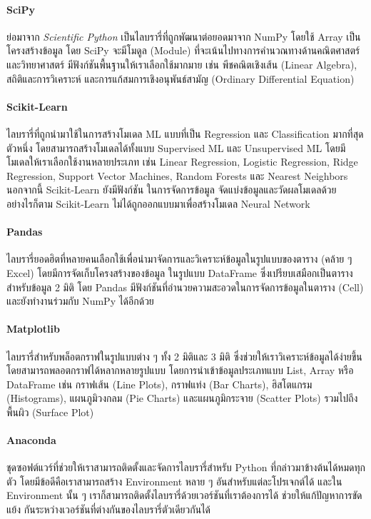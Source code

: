 \paragraph{SciPy} 
ย่อมาจาก \textit{Scientific Python} เป็นไลบรารี่ที่ถูกพัฒนาต่อยอดมาจาก NumPy โดยใช้ Array เป็นโครงสร้างข้อมูล
โดย SciPy จะมีโมดูล (Module) ที่จะเน้นไปทางการคำนวณทางด้านคณิตศาสตร์และวิทยาศาสตร์ มีฟังก์ชันพื้นฐานให้เราเลือกใช้มากมาย เช่น 
พีชคณิตเชิงเส้น (Linear Algebra), สถิติและการวิเคราะห์ และการแก้สมการเชิงอนุพันธ์สามัญ (Ordinary Differential Equation)

\paragraph{Scikit-Learn}
ไลบรารี่ที่ถูกนำมาใช้ในการสร้างโมเดล ML แบบที่เป็น Regression และ Classification มากที่สุดตัวหนึ่ง โดยสามารถสร้างโมเดลได้ทั้งแบบ 
Supervised ML และ Unsupervised ML โดยมีโมเดลให้เราเลือกใช้งานหลายประเภท เช่น Linear Regression, Logistic Regression, 
Ridge Regression, Support Vector Machines, Random Forests และ Nearest Neighbors นอกจากนี้ Scikit-Learn ยังมีฟังก์ชัน%
ในการจัดการข้อมูล จัดแบ่งข้อมูลและวัดผลโมเดลด้วย อย่างไรก็ตาม Scikit-Learn ไม่ได้ถูกออกแบบมาเพื่อสร้างโมเดล Neural Network

\paragraph{Pandas}
ไลบรารี่ยอดฮิตที่หลายคนเลือกใช้เพื่อนำมาจัดการและวิเคราะห์ข้อมูลในรูปแบบของตาราง (คล้าย ๆ Excel) โดยมีการจัดเก็บโครงสร้างของข้อมูล%
ในรูปแบบ DataFrame ซึ่งเปรียบเสมือกเป็นตารางสำหรับข้อมูล 2 มิติ โดย Pandas มีฟังก์ชันที่อำนวยความสะอวดในการจัดการข้อมูลในตาราง (Cell) 
และยังทำงานร่วมกับ NumPy ได้อีกด้วย

\paragraph{Matplotlib}
ไลบรารี่สำหรับพล็อตกราฟในรูปแบบต่าง ๆ ทั้ง 2 มิติและ 3 มิติ ซึ่งช่วยให้เราวิเคราะห์ข้อมูลได้ง่ายขึ้น โดยสามารถพลอตกราฟได้หลากหลายรูปแบบ%
โดยการนำเข้าข้อมูลประเภทแบบ List, Array หรือ DataFrame เช่น กราฟเส้น (Line Plots), กราฟแท่ง (Bar Charts), ฮิสโตแกรม 
(Histograms), แผนภูมิวงกลม (Pie Charts) และแผนภูมิกระจาย (Scatter Plots) รวมไปถึงพื้นผิว (Surface Plot)

\paragraph{Anaconda}
ชุดซอฟต์แวร์ที่ช่วยให้เราสามารถติดตั้งและจัดการไลบรารี่สำหรับ Python ที่กล่าวมาข้างต้นได้หมดทุกตัว โดยมีข้อดีคือเราสามารถสร้าง Environment 
หลาย ๆ อันสำหรับแต่ละโปรเจกต์ได้ และใน Environment นั้น ๆ เราก็สามารถติดตั้งไลบรารี่ด้วยเวอร์ชันที่เราต้องการได้ ช่วยให้แก้ปัญหาการขัดแย้ง%
กันระหว่างเวอร์ชันที่ต่างกันของไลบรารี่ตัวเดียวกันได้

